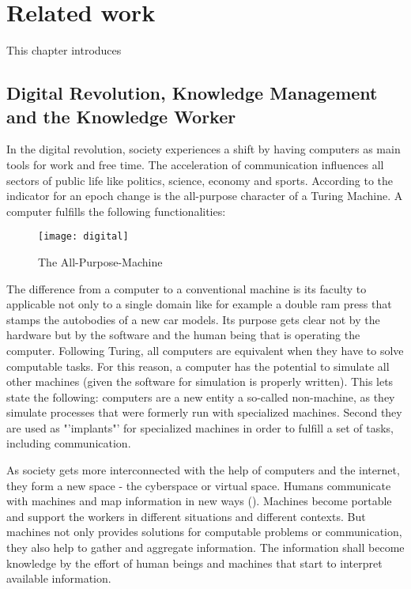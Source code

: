 
\chapter{Related work}
\label{relatedwork}
This chapter introduces

\section{Digital Revolution, Knowledge Management and the Knowledge Worker}
\label{knowledgemanagement}
In the digital revolution, society experiences a shift by having computers as main tools for work and free time. The acceleration of communication influences all sectors of public life like politics, science, economy and sports. According to \cite{buhl1997virtuelle} the indicator for an epoch change is the all-purpose character of a Turing Machine. A computer fulfills the following functionalities:

\begin{figure}[ht]
	\centering
  \texttt{[image: digital]}
	\caption{The All-Purpose-Machine}
	\label{fig1}
\end{figure}

The difference from a computer to a conventional machine is its faculty to applicable not only to a single domain like for example a double ram press that stamps the autobodies of a new car models. Its purpose gets clear not by the hardware but by the software and the human being that is operating the computer. Following Turing, all computers are equivalent when they have to solve computable tasks. For this reason, a computer has the potential to simulate all other machines (given the software for simulation is properly written). This lets \cite{buhl1997virtuelle} state the following: computers are a new entity a so-called non-machine, as they simulate processes that were formerly run with specialized machines. Second they are used as "'implants"' for specialized machines in order to fulfill a set of tasks, including communication. 

As society gets more interconnected with the help of computers and the internet, they form a new space - the cyberspace or virtual space. Humans communicate with machines and map information in new ways (\cite{dodge2001atlas}). Machines become portable and support the workers in different situations and different contexts. But machines not only provides solutions for computable problems or communication, they also help to gather and aggregate information. The information shall become knowledge by the effort of human beings and machines that start to interpret available information. 

